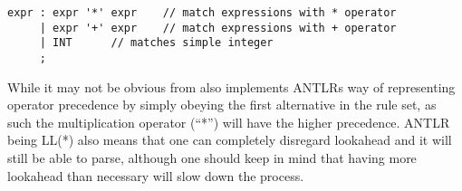 \begin{lstlisting}[caption=An ambiguous rule for expr,frame=tlrb,label={lst:amb}]
expr : expr '*' expr 	// match expressions with * operator
     | expr '+' expr 	// match expressions with + operator
     | INT 		// matches simple integer
     ;
\end{lstlisting}
While it may not be obvious from  also implements ANTLRs way of representing operator precedence by simply obeying the first alternative in the rule set, as such the multiplication operator (``*'') will have the higher precedence.
ANTLR being LL(*) also means that one can completely disregard lookahead and it will still be able to parse, although one should keep in mind that having more lookahead than necessary will slow down the process.\citep{ANTLR4_Book}




